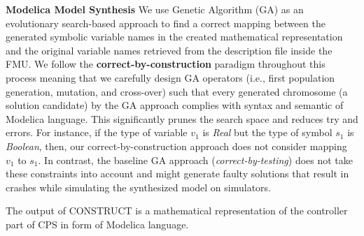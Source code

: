 \documentclass[sigconf,review]{acmart}
\newcommand*\squared[1]{\tikz[baseline=(char.base)]{
\node[shape=rectangle,font=\bfseries,thin,draw=black,fill=yellow,text=black,inner sep=1pt] (char) {#1};}}
\begin{document}
    \squared{4} \textbf{Modelica Model Synthesis} We use Genetic Algorithm (GA) as an evolutionary search-based approach to find a correct mapping between the generated symbolic variable names in the created mathematical representation and the original variable names retrieved from the description file inside the FMU. We follow the \textbf{correct-by-construction} paradigm throughout this process meaning that we carefully design GA operators (i.e., first population generation, mutation, and cross-over) such that every generated chromosome (a solution candidate) by the GA approach complies with syntax and semantic of Modelica language. This significantly prunes the search space and reduces try and errors. For instance, if the type of variable $v_1$ is \textit{Real} but the type of symbol $s_1$ is \textit{Boolean}, then, our correct-by-construction approach does not consider mapping $v_1$ to $s_1$. In contrast, the baseline GA approach (\textit{correct-by-testing}) does not take these constraints into account and might generate faulty solutions that result in crashes while simulating the synthesized model on simulators. %
 
The output of \textsc{CONSTRUCT} is a mathematical representation of the controller part of CPS in form of  Modelica language. 
\end{document}
